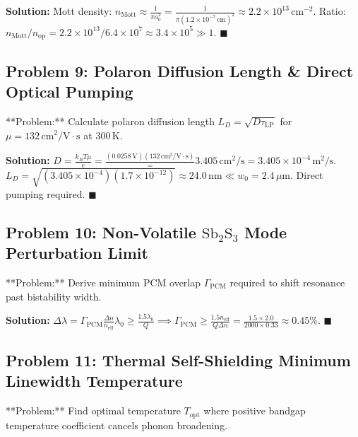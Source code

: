 \documentclass[11pt,oneside]{article}
\begin{document}
\textbf{Solution:}
Mott density: $n_{\text{Mott}} \approx \frac{1}{\pi a_0^2} = \frac{1}{\pi (1.2 \times 10^{-7}\,\text{cm})^2} \approx 2.2 \times 10^{13}\,\text{cm}^{-2}$.
Ratio: $n_{\text{Mott}} / n_{\text{op}} = 2.2 \times 10^{13} / 6.4 \times 10^7 \approx 3.4 \times 10^5 \gg 1$. $\blacksquare$



\subsection{Problem 9: Polaron Diffusion Length & Direct Optical Pumping}
\begin{problembox}
**Problem:** Calculate polaron diffusion length $L_D = \sqrt{D \tau_{\text{LP}}}$ for $\mu = 132\,\text{cm}^2/\text{V}\cdot\text{s}$ at $300\,\text{K}$.
\end{problembox}

\textbf{Solution:}
$D = \frac{k_B T \mu}{e} = \frac{(0.0258\,\text{V})(132\,\text{cm}^2/\text{V}\cdot\text{s})} = 3.405\,\text{cm}^2/\text{s} = 3.405 \times 10^{-4}\,\text{m}^2/\text{s}$.
$L_D = \sqrt{(3.405 \times 10^{-4})(1.7 \times 10^{-12})} \approx 24.0\,\text{nm} \ll w_0 = 2.4\,\mu\text{m}$. Direct pumping required. $\blacksquare$



\subsection{Problem 10: Non-Volatile $\text{Sb}_2\text{S}_3$ Mode Perturbation Limit}
\begin{problembox}
**Problem:** Derive minimum PCM overlap $\Gamma_{\text{PCM}}$ required to shift resonance past bistability width.
\end{problembox}

\textbf{Solution:}
$\Delta \lambda = \Gamma_{\text{PCM}} \frac{\Delta n}{n_{\text{eff}}} \lambda_0 \ge \frac{1.5 \lambda_0}{Q} \implies \Gamma_{\text{PCM}} \ge \frac{1.5 n_{\text{eff}}}{Q \Delta n} = \frac{1.5 \times 2.0}{2000 \times 0.33} \approx 0.45\%$. $\blacksquare$



\subsection{Problem 11: Thermal Self-Shielding Minimum Linewidth Temperature}
\begin{problembox}
**Problem:** Find optimal temperature $T_{\text{opt}}$ where positive bandgap temperature coefficient cancels phonon broadening.
\end{problembox}
\end{document}
